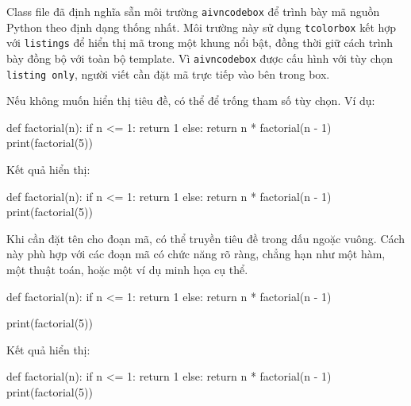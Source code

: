\documentclass[12pt]{eDA_conquer2026}
\begin{document}
Class file đã định nghĩa sẵn môi trường \verb|aivncodebox| để trình bày mã nguồn Python theo định dạng thống nhất. Môi trường này sử dụng \verb|tcolorbox| kết hợp với \verb|listings| để hiển thị mã trong một khung nổi bật, đồng thời giữ cách trình bày đồng bộ với toàn bộ template. Vì \verb|aivncodebox| được cấu hình với tùy chọn \verb|listing only|, người viết cần đặt mã trực tiếp vào bên trong box.

Nếu không muốn hiển thị tiêu đề, có thể để trống tham số tùy chọn. Ví dụ:

\begin{aivnoutputbox}
\begin{aivncodebox}[]
\begin{python}
def factorial(n):
    if n <= 1:
        return 1
    else:
        return n * factorial(n - 1)
print(factorial(5))
\end{python}
\end{aivncodebox}
\end{aivnoutputbox}

Kết quả hiển thị:

\begin{aivncodebox}[]
\begin{python}
def factorial(n):
    if n <= 1:
        return 1
    else:
        return n * factorial(n - 1)
print(factorial(5))
\end{python}
\end{aivncodebox}

Khi cần đặt tên cho đoạn mã, có thể truyền tiêu đề trong dấu ngoặc vuông. Cách này phù hợp với các đoạn mã có chức năng rõ ràng, chẳng hạn như một hàm, một thuật toán, hoặc một ví dụ minh họa cụ thể.

\begin{aivnoutputbox}
\begin{aivncodebox}
\begin{python}
def factorial(n):
    if n <= 1:
        return 1
    else:
        return n * factorial(n - 1)

print(factorial(5))
\end{python}
\end{aivncodebox}
\end{aivnoutputbox}

\newpage
Kết quả hiển thị:

\begin{aivncodebox}
\begin{python}
def factorial(n):
    if n <= 1:
        return 1
    else:
        return n * factorial(n - 1)
print(factorial(5))
\end{python}
\end{aivncodebox}
\end{document}
